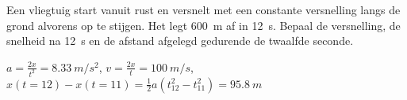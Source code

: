 

\item[\SI{80}{\percent} (b)] Een vliegtuig start vanuit rust en versnelt met een constante versnelling langs de grond alvorens op te stijgen. Het legt \SI{600}{m} af in \SI{12}{s}. Bepaal de versnelling, de snelheid na \SI{12}{s} en de afstand afgelegd gedurende de twaalfde seconde.

\begin{oplossing}
	$a=\frac{2x}{t^2}=\SI{8,33}{m/s^2}$,
	$v=\frac{2x}{t}=\SI{100}{m/s}$,
	$x(t=12)-x(t=11)=\frac{1}{2}a(t_{12}^2-t_{11}^2)=\SI{95,8}{m}$
\end{oplossing}
